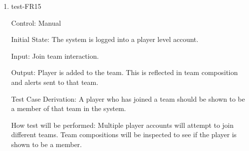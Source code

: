 \documentclass[12pt, titlepage]{article}
\begin{document}
\begin{enumerate}
  \item{test-FR15\\}

  Control: Manual

  Initial State: The system is logged into a player level account.

  Input: Join team interaction.

  Output: Player is added to the team. This is reflected in team composition
  and alerts sent to that team.

  Test Case Derivation: A player who has joined a team should be shown to be a
  member of that team in the system.

  How test will be performed: Multiple player accounts will attempt to join 
  different teams. Team compositions will be inspected to see if the player
  is shown to be a member. 








\end{enumerate}



\end{document}
